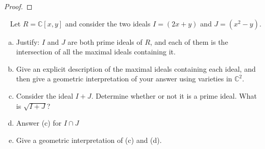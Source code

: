 \documentclass{article}
\begin{document}
\begin{proof}
\end{proof}
\pagebreak
\begin{problem}{3} ~
  Let $R = \mathbb C[x, y]$ and consider the two ideals $I = (2x + y)$ and $J = (x^2 - y)$.
  \begin{enumerate}[(a)]
    \item Justify: $I$ and $J$ are both prime ideals of $R$, and each of them is
    the intersection of all the maximal ideals containing it.
    \item Give an explicit description of the maximal ideals containing each
    ideal, and then give a geometric interpretation of your answer using
    varieties in $\mathbb C^2$.
    \item Consider the ideal $I + J$. Determine whether or not it is a prime
    ideal. What is $\sqrt{I + J}$?
    \item Answer (c) for $I \cap J$
    \item Give a geometric interpretation of (c) and (d).
  \end{enumerate}
\end{problem}
\end{document}

